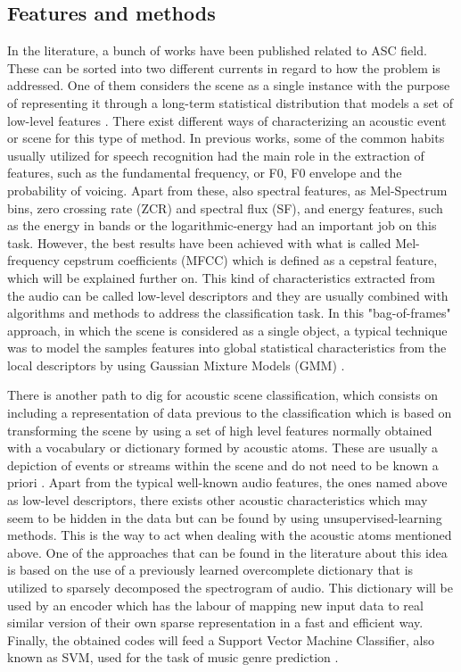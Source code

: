 \subsection{Features and methods}
In the literature, a bunch of works have been published related to ASC field. These can be sorted into two different currents in regard to how the problem is addressed. One of them considers the scene as a single instance with the purpose of representing it through a long-term statistical distribution that models a set of low-level features \cite{Stowell2015}. There exist different ways of characterizing an acoustic event or scene for this type of method. In previous works, some of the common habits usually utilized for speech recognition had the main role in the extraction of features, such as the fundamental frequency, or F0, F0 envelope and the probability of voicing. Apart from these, also spectral features, as Mel-Spectrum bins, zero crossing rate (ZCR) and spectral flux (SF), and energy features, such as the energy in bands or the logarithmic-energy \cite{Geiger2013} had an important job on this task. However, the best results have been achieved with what is called Mel-frequency cepstrum coefficients (MFCC) which is defined as a cepstral feature, which will be explained further on. This kind of characteristics extracted from the audio can be called low-level descriptors and they are usually combined with algorithms and methods to address the classification task. In this "bag-of-frames" approach, in which the scene is considered as a single object, a typical technique was to model the samples features into global statistical characteristics from the local descriptors by using Gaussian Mixture Models (GMM) \cite{Aucouturier2007}.

There is another path to dig for acoustic scene classification, which consists on including a representation of data previous to the classification which is based on transforming the scene by using a set of high level features normally obtained with a vocabulary or dictionary formed by acoustic atoms. These are usually a depiction of events or streams within the scene and do not need to be known a priori \cite{Stowell2015}. Apart from the typical well-known audio features, the ones named above as low-level descriptors, there exists other acoustic characteristics which may seem to be hidden in the data but can be found by using unsupervised-learning methods. This is the way to act when dealing with the acoustic atoms mentioned above. 
One of the approaches that can be found in the literature about this idea is based on the use of a previously learned overcomplete dictionary that is utilized to sparsely decomposed the spectrogram of audio. This dictionary will be used by an encoder which has the labour of mapping new input data to real similar version of their own sparse representation in a fast and efficient way. Finally, the obtained codes will feed a Support Vector Machine Classifier, also known as SVM, used for the task of music genre prediction \cite{Henaff2011}. 


